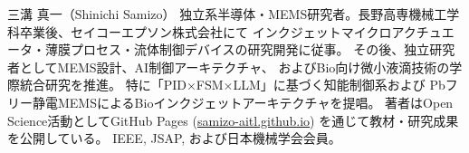 \documentclass[conference]{IEEEtran}
\begin{document}
\begin{IEEEbiography}{三溝 真一（Shinichi Samizo）}
独立系半導体・MEMS研究者。長野高専機械工学科卒業後、セイコーエプソン株式会社にて
インクジェットマイクロアクチュエータ・薄膜プロセス・流体制御デバイスの研究開発に従事。
その後、独立研究者としてMEMS設計、AI制御アーキテクチャ、
およびBio向け微小液滴技術の学際統合研究を推進。
特に「PID×FSM×LLM」に基づく知能制御系および
Pbフリー静電MEMSによるBioインクジェットアーキテクチャを提唱。
著者はOpen Science活動としてGitHub Pages
(\href{https://samizo-aitl.github.io}{samizo-aitl.github.io})
を通じて教材・研究成果を公開している。
IEEE, JSAP, および日本機械学会会員。
\end{IEEEbiography}

\balance
\end{document}
